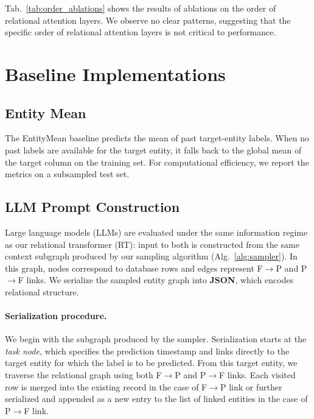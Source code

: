 Tab.~\ref{tab:order_ablations} shows the results of ablations on the order of relational attention layers. We observe no clear patterns, suggesting that the specific order of relational attention layers is not critical to performance.


\section{Baseline Implementations}
\label{app:baselines}


\subsection{Entity Mean}
\label{app:entity_mean}

The EntityMean baseline predicts the mean of past target-entity labels. When no past labels are available for the target entity, it falls back to the global mean of the target column on the training set. For computational efficiency, we report the metrics on a subsampled test set.


\subsection{LLM Prompt Construction}
\label{app:llm_prompting}

Large language models (LLMs) are evaluated under the same information regime as our relational
transformer (RT): input to both is constructed from the same context subgraph produced by our sampling algorithm (Alg.~\ref{alg:sampler}). In this graph, nodes correspond to database rows and edges represent
F$\to$P and P$\to$F links. We serialize the sampled entity graph into
\textbf{JSON}, which encodes relational structure.

\paragraph{Serialization procedure.}
We begin with the subgraph produced by the sampler. Serialization starts at the \emph{task node},
which specifies the prediction timestamp and links directly to the target entity for which the label
is to be predicted. From this target entity, we traverse the relational graph using both F$\to$P and
P$\to$F links. Each visited row is merged into the existing record in the case of F$\to$P link or further serialized and appended as a new entry to the list of linked entities in the case of
P$\to$F link.



